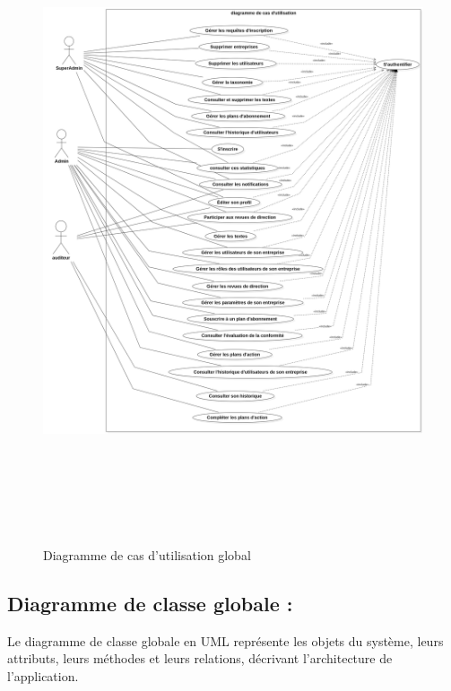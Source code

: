 \begin{figure}[H]
    \centering
    \includegraphics[width=18cm,height=19cm]{images/UseCaseDiagram.png}
    \caption{Diagramme de cas d'utilisation global}
\end{figure}

\subsection{Diagramme de classe globale :}

\noindent Le diagramme de classe globale en UML représente les objets du système, leurs attributs, leurs méthodes et leurs relations, décrivant l'architecture de l'application.

